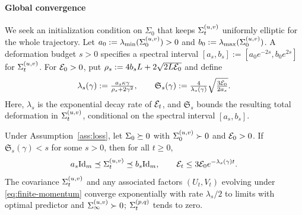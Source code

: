 \paragraph{Global convergence}
We seek an initialization condition on $\Sigma_0$ that keeps $\Sigma^{(u,v)}_t$ uniformly elliptic for the whole trajectory.
Let $a_0:=\lambda_{\min}(\Sigma^{(u,v)}_0)>0$ and $b_0:=\lambda_{\max}(\Sigma^{(u,v)}_0)$.
A deformation budget $s>0$ specifies a spectral interval $[a_s,b_s]:=[a_0e^{-2s},b_0e^{2s}]$ for $\Sigma^{(u,v)}_t$.
For $\mathcal E_0>0$, put $\rho_s:=4b_sL+2\sqrt{2L\mathcal E_0}$ and define
\begin{equation}\label{eq:certificate}
 \lambda_s(\gamma):=\tfrac{a_s\kappa\gamma}{\rho_s+2\gamma^2},\qquad
 \mathfrak S_s(\gamma):=\tfrac4{\lambda_s(\gamma)}
             \sqrt{\tfrac{3\mathcal E_0}{2a_s}}.
\end{equation}
Here, $\lambda_s$ is the exponential decay rate of $\mathcal E_t$, and $\mathfrak S_s$ bounds the resulting total deformation in $\Sigma^{(u,v)}_t$, conditional on the spectral interval $[a_s, b_s]$.

\begin{theorem}\label{thm:momentum}\label{thm:bootstrap-unconditional-rate}
Under Assumption~\ref{ass:loss}, let $\Sigma_0\succeq0$ with
$\Sigma^{(u,v)}_0\succ0$ and $\mathcal E_0>0$. If
$\mathfrak S_s(\gamma)<s$ for some $s>0$, then for all $t\ge0$,
\[
 a_s\mathrm{Id}_m\preceq\Sigma^{(u,v)}_t\preceq b_s\mathrm{Id}_m,\qquad
 \mathcal E_t\le3\mathcal E_0 e^{-\lambda_s(\gamma)t}.
\]
The covariance $\Sigma^{(u,v)}_t$ and any associated factors
$(U_t,V_t)$ evolving under \eqref{eq:finite-momentum} converge exponentially with rate $\lambda_s/2$ to limits with optimal predictor and $\Sigma^{(u,v)}_\infty\succ0$; $\Sigma^{(p,q)}_t$ tends to zero.
\end{theorem}

